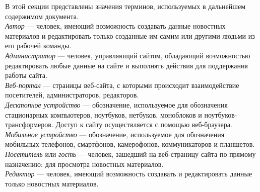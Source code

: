 В этой секции представлены значения терминов, используемых в дальнейшем содержимом документа.\\[2mm]

\noindent
\textit{Автор} --- человек, имеющий возможность создавать данные новостных материалов и редактировать только созданные им самим или другими людьми из его рабочей команды.
\\[2mm]
\textit{Администратор} --- человек, управляющий сайтом, обладающий возможностью редактировать любые данные на сайте и выполнять действия для поддержания работы сайта.
\\[2mm]
\textit{Веб-портал} --- страницы веб-сайта, с которыми происходит взаимодействие посетителей, администраторов, редакторов.
\\[2mm]
\textit{Десктопное устройство} --- обозначение, используемое для обозначения стационарных компьютеров, ноутбуков, нетбуков, моноблоков и ноутбуков-трансформеров. Доступ к сайту осуществляется с помощью веб-браузера.\\[2mm]
\textit{Мобильное устройство} --- обозначение, используемое для обозначения мобильных телефонов, смартфонов, камерофонов, коммуникаторов и планшетов.\\[2mm]
\textit{Посетитель} или \textit{гость} --- человек, зашедший на веб-страницу сайта по прямому назначению: для просмотра новостных материалов. 
\\[2mm]
\textit{Редактор} --- человек, имеющий возможность создавать и редактировать данные только новостных материалов.

